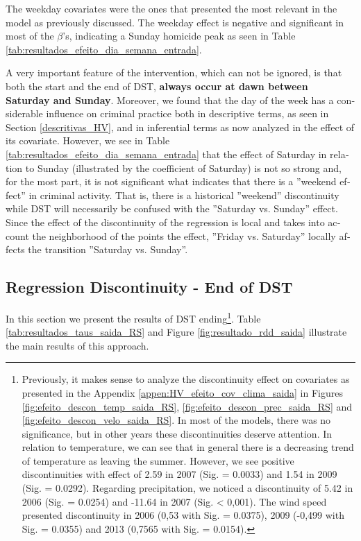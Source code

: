 \documentclass[12pt,openright,oneside,a4paper,english,french,spanish]{abntex2}
\numberwithin{table}{section} %
\numberwithin{figure}{section} %
\begin{document}
\begin{otherlanguage}{english}
The weekday covariates were the ones that presented the most relevant in the model as previously discussed. The weekday effect is negative and significant in most of the $\beta$'s, indicating a Sunday homicide peak as seen in Table \ref{tab:resultados_efeito_dia_semana_entrada}.

A very important feature of the intervention, which can not be ignored, is that both the start and the end of DST, \textbf{always occur at dawn between Saturday and Sunday}. Moreover, we found that the day of the week has a considerable influence on criminal practice both in descriptive terms, as seen in Section \ref{descritivas_HV}, and in inferential terms as now analyzed in the effect of its covariate. However, we see in Table \ref{tab:resultados_efeito_dia_semana_entrada} that the effect of Saturday in relation to Sunday (illustrated by the coefficient of Saturday) is not so strong and, for the most part, it is not significant what indicates that there is a ''weekend effect'' in criminal activity. That is, there is a historical ''weekend'' discontinuity while DST will necessarily be confused with the ''Saturday vs. Sunday'' effect. Since the effect of the discontinuity of the regression is local and takes into account the neighborhood of the points the effect, ''Friday vs. Saturday'' locally affects the transition ''Saturday vs. Sunday''.









\subsection{Regression Discontinuity - End of DST\label{resultados_RDD_saida}}

In this section we present the results of DST ending\footnote{Previously, it makes sense to analyze the discontinuity effect on covariates as presented in the Appendix \ref{appen:HV_efeito_cov_clima_saida} in Figures \ref{fig:efeito_descon_temp_saida_RS}, \ref{fig:efeito_descon_prec_saida_RS} and \ref{fig:efeito_descon_velo_saida_RS}. In most of the models, there was no significance, but in other years these discontinuities deserve attention. In relation to temperature, we can see that in general there is a decreasing trend of temperature as leaving the summer. However, we see positive discontinuities with effect of 2.59 in 2007 (Sig. = 0.0033) and 1.54 in 2009 (Sig. = 0.0292). Regarding precipitation, we noticed a discontinuity of 5.42 in 2006 (Sig. = 0.0254) and -11.64 in 2007 (Sig. < 0,001). The wind speed presented discontinuity in 2006 (0,53 with Sig. = 0.0375), 2009 (-0,499 with Sig. = 0.0355) and 2013 (0,7565 with Sig. = 0.0154).}. Table \ref{tab:resultados_taus_saida_RS} and Figure \ref{fig:resultado_rdd_saida} illustrate the main results of this approach.


\end{otherlanguage}
\end{document}
